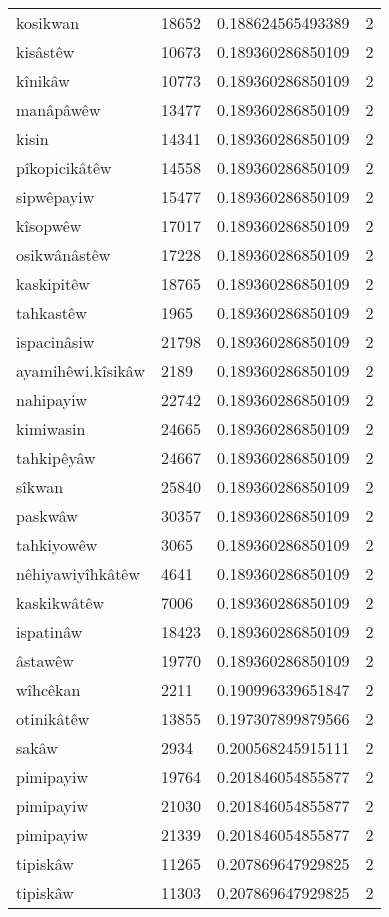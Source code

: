 \begin{longtable}{llll}
kosikwan & 18652 & 0.188624565493389 & 2 \\
kisâstêw & 10673 & 0.189360286850109 & 2 \\
kînikâw & 10773 & 0.189360286850109 & 2 \\
manâpâwêw & 13477 & 0.189360286850109 & 2 \\
kisin & 14341 & 0.189360286850109 & 2 \\
pîkopicikâtêw & 14558 & 0.189360286850109 & 2 \\
sipwêpayiw & 15477 & 0.189360286850109 & 2 \\
kîsopwêw & 17017 & 0.189360286850109 & 2 \\
osikwânâstêw & 17228 & 0.189360286850109 & 2 \\
kaskipitêw & 18765 & 0.189360286850109 & 2 \\
tahkastêw & 1965 & 0.189360286850109 & 2 \\
ispacinâsiw & 21798 & 0.189360286850109 & 2 \\
ayamihêwi.kîsikâw & 2189 & 0.189360286850109 & 2 \\
nahipayiw & 22742 & 0.189360286850109 & 2 \\
kimiwasin & 24665 & 0.189360286850109 & 2 \\
tahkipêyâw & 24667 & 0.189360286850109 & 2 \\
sîkwan & 25840 & 0.189360286850109 & 2 \\
paskwâw & 30357 & 0.189360286850109 & 2 \\
tahkiyowêw & 3065 & 0.189360286850109 & 2 \\
nêhiyawiyîhkâtêw & 4641 & 0.189360286850109 & 2 \\
kaskikwâtêw & 7006 & 0.189360286850109 & 2 \\
ispatinâw & 18423 & 0.189360286850109 & 2 \\
âstawêw & 19770 & 0.189360286850109 & 2 \\
wîhcêkan & 2211 & 0.190996339651847 & 2 \\
otinikâtêw & 13855 & 0.197307899879566 & 2 \\
sakâw & 2934 & 0.200568245915111 & 2 \\
pimipayiw & 19764 & 0.201846054855877 & 2 \\
pimipayiw & 21030 & 0.201846054855877 & 2 \\
pimipayiw & 21339 & 0.201846054855877 & 2 \\
tipiskâw & 11265 & 0.207869647929825 & 2 \\
tipiskâw & 11303 & 0.207869647929825 & 2 \\

\end{longtable}
